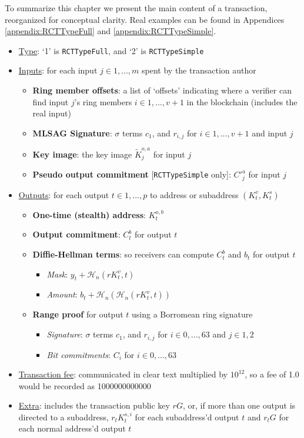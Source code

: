 To summarize this chapter we present the main content of a transaction, reorganized for conceptual clarity. Real examples can be found in Appendices \ref{appendix:RCTTypeFull} and \ref{appendix:RCTTypeSimple}.

\begin{itemize}
    \item \underline{Type}: `1' is {\tt RCTTypeFull}, and `2' is {\tt RCTTypeSimple}
    \item \underline{Inputs}: for each input $j \in 1,...,m$ spent by the transaction author
    \begin{itemize}
        \item \textbf{Ring member offsets}: a list of `offsets' indicating where a verifier can find input $j$'s ring members $i \in 1,...,v+1$ in the blockchain (includes the real input)
        \item \textbf{MLSAG Signature}: $\sigma$ terms $c_1$, and $r_{i,j}$ for $i \in 1,...,v+1$ and input $j$
        \item \textbf{Key image}: the key image $\tilde{K}^{o,a}_j$ for input $j$
        \item \textbf{Pseudo output commitment} {[{\tt RCTTypeSimple} only]}: $C'^{a}_j$ for input $j$
    \end{itemize}
    
    \item \underline{Outputs}: for each output $t \in 1,...,p$ to address or subaddress $(K^v_t,K^s_t)$
    \begin{itemize}
        \item \textbf{One-time (stealth) address}: $K^{o,b}_t$
        \item \textbf{Output commitment}: $C^{b}_t$ for output $t$
        \item \textbf{Diffie-Hellman terms}: so receivers can compute $C^{b}_t$ and $b_t$ for output $t$
        \begin{itemize}
            \item \textit{Mask}: $y_t + \mathcal{H}_n(r K^v_t,t)$
            \item \textit{Amount}: $b_t + \mathcal{H}_n(\mathcal{H}_n(r K^v_t,t))$
        \end{itemize}
        \item \textbf{Range proof} for output $t$ using a Borromean ring signature
        \begin{itemize}
            \item \textit{Signature}: $\sigma$ terms $c_1$, and $r_{i,j}$ for $i \in 0,...,63$ and $j \in 1,2$
            \item \textit{Bit commitments}: $C_i$ for $i \in 0,...,63$
        \end{itemize}
    \end{itemize}
    \item \underline{Transaction fee}: communicated in clear text multiplied by $10^{12}$, so a fee of 1.0 would be recorded as 1000000000000
    \item \underline{Extra}: includes the transaction public key $r G$, or, if more than one output is directed to a subaddress, $r_t K^{s,i}_t$ for each subaddress'd output $t$ and $r_t G$ for each normal address'd output $t$
\end{itemize}